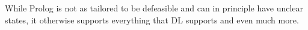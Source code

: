 \documentclass{article}
\newtheorem{example}{Example}
\begin{document}

While Prolog is not as tailored to be defeasible and can in principle have unclear states, it otherwise supports everything that DL supports and even much more. \cite{morelliralphPROLOGFactsRules}
\end{document}
